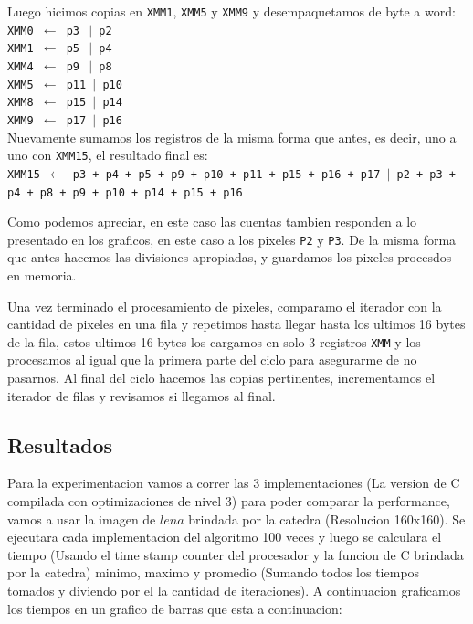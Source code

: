Luego hicimos copias en \texttt{XMM1}, \texttt{XMM5} y \texttt{XMM9} y desempaquetamos de byte a word:\\

\noindent
\texttt{XMM0 $\gets$ p3 $\ \vert$ p2}\\
\texttt{XMM1 $\gets$ p5 $\ \vert$ p4}\\
\texttt{XMM4 $\gets$ p9 $\ \vert$ p8}\\
\texttt{XMM5 $\gets$ p11 $\vert$ p10}\\
\texttt{XMM8 $\gets$ p15 $\vert$ p14}\\
\texttt{XMM9 $\gets$ p17 $\vert$ p16}\\

Nuevamente sumamos los registros de la misma forma que antes, es decir, uno a uno con \texttt{XMM15}, el resultado final es:\\

\noindent
\texttt{XMM15 $\gets$ p3 + p4 + p5 + p9 + p10 + p11 + p15 + p16 + p17 $\vert$ p2 + p3 + p4 + p8 + p9 + p10 + p14 + p15 + p16}

Como podemos apreciar, en este caso las cuentas tambien responden a lo presentado en los graficos, en este caso a los pixeles \texttt{P2} y \texttt{P3}. De la misma forma que antes hacemos las divisiones apropiadas, y guardamos los pixeles procesdos en memoria.

Una vez terminado el procesamiento de pixeles, comparamo el iterador con la cantidad de pixeles en una fila y repetimos hasta llegar hasta los ultimos 16 bytes de la fila, estos ultimos 16 bytes los cargamos en solo 3 registros \texttt{XMM} y los procesamos al igual que la primera parte del ciclo para asegurarme de no pasarnos. Al final del ciclo hacemos las copias pertinentes, incrementamos el iterador de filas y revisamos si llegamos al final. \\

\subsection{Resultados}
Para la experimentacion vamos a correr las 3 implementaciones (La version de C compilada con optimizaciones de nivel 3) para poder comparar la performance, vamos a usar la imagen de $lena$ brindada por la catedra (Resolucion 160x160). Se ejecutara cada implementacion del algoritmo 100 veces y luego se calculara el tiempo (Usando el time stamp counter del procesador y la funcion de C brindada por la catedra) minimo, maximo y promedio (Sumando todos los tiempos tomados y diviendo por el la cantidad de iteraciones). A continuacion graficamos los tiempos en un grafico de barras que esta a continuacion:

